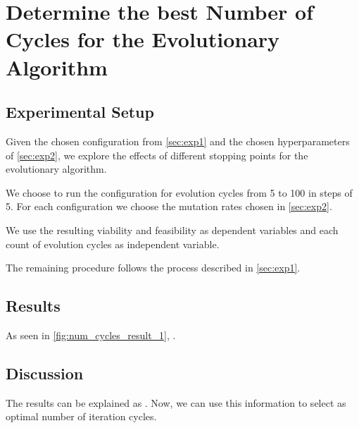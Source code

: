 \documentclass[./../../paper.tex]{subfiles}
\begin{document}
\section{Determine the best Number of Cycles for the Evolutionary Algorithm }

\subsection{Experimental Setup}
\label{sec:exp3}
Given the chosen configuration from \autoref{sec:exp1} and the chosen hyperparameters of \autoref{sec:exp2}, we explore the effects of different stopping points for the evolutionary algorithm. 

We choose to run the configuration for evolution cycles from 5 to 100 in steps of 5. 
For each configuration we choose the mutation rates chosen in \autoref{sec:exp2}. 

We use the resulting viability and feasibility as dependent variables and each count of evolution cycles as independent variable.

The remaining procedure follows the process described in \autoref{sec:exp1}.

\subsection{Results}




As seen in \autoref{fig:num_cycles_result_1}, .

\subsection{Discussion}
The results can be explained as . Now, we can use this information to select  as optimal number of iteration cycles. 
\end{document}
